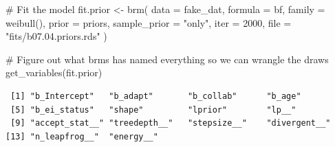 \documentclass[
  letterpaper,
  DIV=11,
  numbers=noendperiod]{scrreprt}
\newenvironment{Shaded}{\begin{snugshade}}{\end{snugshade}}
\newcommand{\AttributeTok}[1]{\textcolor[rgb]{0.40,0.45,0.13}{#1}}
\newcommand{\CommentTok}[1]{\textcolor[rgb]{0.37,0.37,0.37}{#1}}
\newcommand{\DecValTok}[1]{\textcolor[rgb]{0.68,0.00,0.00}{#1}}
\newcommand{\FunctionTok}[1]{\textcolor[rgb]{0.28,0.35,0.67}{#1}}
\newcommand{\NormalTok}[1]{\textcolor[rgb]{0.00,0.23,0.31}{#1}}
\newcommand{\OtherTok}[1]{\textcolor[rgb]{0.00,0.23,0.31}{#1}}
\newcommand{\StringTok}[1]{\textcolor[rgb]{0.13,0.47,0.30}{#1}}
\begin{document}
\begin{Shaded}
\begin{Highlighting}[]
\CommentTok{\# Fit the model}
\NormalTok{fit.prior }\OtherTok{\textless{}{-}} \FunctionTok{brm}\NormalTok{(}
  \AttributeTok{data =}\NormalTok{ fake\_dat,}
  \AttributeTok{formula =}\NormalTok{ bf,}
  \AttributeTok{family =} \FunctionTok{weibull}\NormalTok{(),}
  \AttributeTok{prior =}\NormalTok{ priors,}
  \AttributeTok{sample\_prior =} \StringTok{"only"}\NormalTok{,}
  \AttributeTok{iter =} \DecValTok{2000}\NormalTok{,}
  \AttributeTok{file =} \StringTok{"fits/b07.04.priors.rds"}
\NormalTok{)}

\CommentTok{\# Figure out what brms has named everything so we can wrangle the draws}
\FunctionTok{get\_variables}\NormalTok{(fit.prior)}
\end{Highlighting}
\end{Shaded}

\begin{verbatim}
 [1] "b_Intercept"   "b_adapt"       "b_collab"      "b_age"        
 [5] "b_ei_status"   "shape"         "lprior"        "lp__"         
 [9] "accept_stat__" "treedepth__"   "stepsize__"    "divergent__"  
[13] "n_leapfrog__"  "energy__"     
\end{verbatim}
\end{document}

